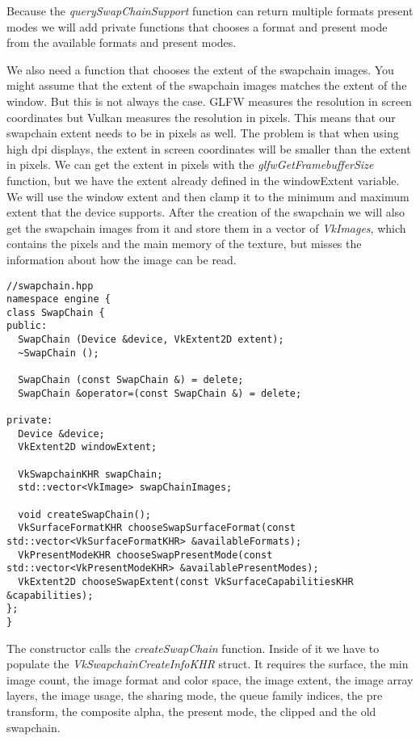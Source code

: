 \documentclass[12pt]{report} \usepackage{preamble}
\begin{document}
Because the \textit{querySwapChainSupport} function can return multiple formats present \\
modes we will add private functions that chooses a format and present mode from
the available formats and present modes.

We also need a function that chooses the extent of the swapchain images. You might assume that the extent of the
swapchain images matches the extent of the window. But this is not always the case. \ac{GLFW} measures the resolution
in screen coordinates but Vulkan measures the resolution in pixels. This means that our swapchain extent needs
to be in pixels as well. The problem is that when using high dpi displays, the extent in screen coordinates
will be smaller than the extent in pixels. We can get the extent in pixels with the \textit{glfwGetFramebufferSize}
function, but we have the extent already defined in the windowExtent variable. We will use the window extent
and then clamp it to the minimum and maximum extent that the device supports.
After the creation of the swapchain we will also get the swapchain images from it and store them in a vector of
\textit{VkImages}, which contains the pixels and the main memory of the texture, but misses the information about
how the image can be read.

\begin{lstlisting}[Language=C++]
//swapchain.hpp
namespace engine {
class SwapChain {
public:
  SwapChain (Device &device, VkExtent2D extent);
  ~SwapChain ();

  SwapChain (const SwapChain &) = delete;
  SwapChain &operator=(const SwapChain &) = delete;

private:
  Device &device;
  VkExtent2D windowExtent;

  VkSwapchainKHR swapChain;
  std::vector<VkImage> swapChainImages;

  void createSwapChain();
  VkSurfaceFormatKHR chooseSwapSurfaceFormat(const std::vector<VkSurfaceFormatKHR> &availableFormats);
  VkPresentModeKHR chooseSwapPresentMode(const std::vector<VkPresentModeKHR> &availablePresentModes);
  VkExtent2D chooseSwapExtent(const VkSurfaceCapabilitiesKHR &capabilities);
};
}

\end{lstlisting}

The constructor calls the \textit{createSwapChain} function. Inside of it we have
to populate the \textit{VkSwapchainCreateInfoKHR} struct. It requires the surface,
the min image count, the image format and color space, the image extent, the image
array layers, the image usage, the sharing mode, the queue family indices, the
pre transform, the composite alpha, the present mode, the clipped and the old swapchain.
\end{document}

